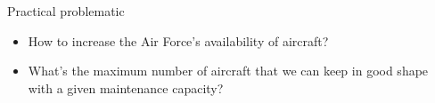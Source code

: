 \documentclass[final]{beamer}
\newlength{\sepwid}
\newlength{\onecolwid}
\begin{document}




\setlength{\belowcaptionskip}{2ex} %
\setlength\belowdisplayshortskip{2ex} %

\begin{frame}[t] %


\begin{columns}[t] %

	\begin{column}{\sepwid}\end{column} %

	\begin{column}{\onecolwid} %


		\begin{alertblock}{Practical problematic}
				
			\begin{itemize}
			\item How to increase the Air Force's availability of aircraft?
			\item What's the maximum number of aircraft that we can keep in good shape with a given maintenance capacity?
			\end{itemize}
		\end{alertblock}


\end{column}
\end{columns}
\end{frame}
\end{document}
